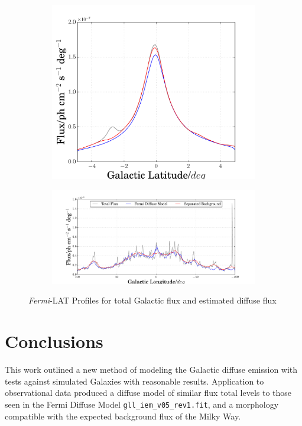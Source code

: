 \documentclass{PoS}
\begin{document}
\begin{figure}
\centering
\begin{subfigure}{0.32\textwidth}
      \includegraphics[width=\textwidth]{figures/GLAT.pdf}
\end{subfigure}
\begin{subfigure}{0.6\textwidth}
        \includegraphics[width=\textwidth]{figures/GLON.pdf}
\end{subfigure}
\caption{\textit{Fermi}-LAT Profiles for total Galactic flux and estimated diffuse flux}
  \vspace{-15pt}
\end{figure}

\section{Conclusions}

This work outlined a new method of modeling the Galactic diffuse emission with tests against simulated Galaxies with reasonable results. Application to observational data produced a diffuse model of similar flux total levels to those seen in the Fermi Diffuse Model \verb|gll_iem_v05_rev1.fit|, and a morphology compatible with the expected background flux of the Milky Way.
\end{document}

